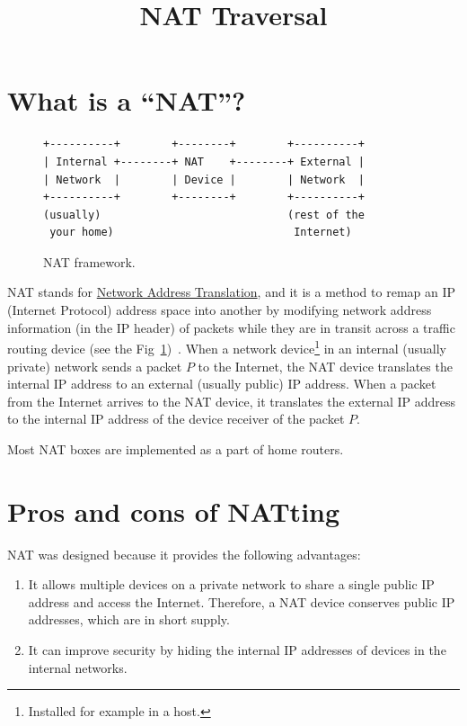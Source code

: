 
\title{NAT Traversal}

\maketitle
\tableofcontents

\section{What is a ``NAT''?}

\begin{figure}
\begin{verbatim}
+----------+        +--------+        +----------+
| Internal +--------+ NAT    +--------+ External |
| Network  |        | Device |        | Network  |
+----------+        +--------+        +----------+
(usually)                             (rest of the
 your home)                            Internet)
\end{verbatim}
\caption{NAT framework.}
\label{fig:NAT_framework}
\end{figure}


NAT stands for
\href{https://en.wikipedia.org/wiki/Network_address_translation}{Network
  Address Translation}, and it is a method to remap an IP (Internet
Protocol) address space into another by modifying network address
information (in the IP header) of packets while they are in transit
across a traffic routing device (see the
Fig~\ref{fig:NAT_framework})~\cite{srisuresh1999nat,Srisuresh2001}. When
a network device\footnote{Installed for example in a host.} in an
internal (usually private) network sends a packet $P$ to the Internet,
the NAT device translates the internal IP address to an external
(usually public) IP address. When a packet from the Internet arrives
to the NAT device, it translates the external IP address to the
internal IP address of the device receiver of the packet $P$.

Most NAT boxes are implemented as a part of home routers.

\section{Pros and cons of NATting}

NAT was designed because it provides the following advantages:
\begin{enumerate}
\item It allows multiple devices on a private network to share a
  single public IP address and access the Internet. Therefore, a NAT
  device conserves public IP addresses, which are in short supply.
\item It can improve security by hiding the internal IP addresses of
  devices in the internal networks.
\end{enumerate}


